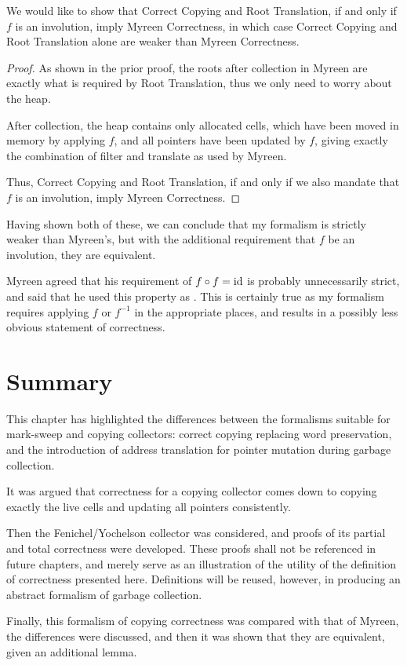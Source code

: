 \begin{theorem}
  We would like to show that Correct Copying and Root Translation, if
  and only if $f$ is an involution, imply Myreen Correctness, in which
  case Correct Copying and Root Translation alone are weaker than
  Myreen Correctness.
\end{theorem}

\begin{proof}
    As shown in the prior proof, the roots after collection in Myreen
    are exactly what is required by Root Translation, thus we only
    need to worry about the heap.

    After collection, the heap contains only allocated cells, which
    have been moved in memory by applying $f$, and all pointers have
    been updated by $f$, giving exactly the combination of filter and
    translate as used by Myreen.

    Thus, Correct Copying and Root Translation, if and only if we also
    mandate that $f$ is an involution, imply Myreen Correctness.
\end{proof}

Having shown both of these, we can conclude that my formalism is
strictly weaker than Myreen's, but with the additional requirement
that $f$ be an involution, they are equivalent.

Myreen\cite{MyreenEmail} agreed that his requirement of $f \circ f =
\mathrm{id}$ is probably unnecessarily strict, and said that he used this
property as . This is certainly true as my formalism requires
applying $f$ or $f^{-1}$ in the appropriate places, and results in a
possibly less obvious statement of correctness.

\section{Summary}
\label{sec:copying-summary}

This chapter has highlighted the differences between the formalisms
suitable for mark-sweep and copying collectors: correct copying
replacing word preservation, and the introduction of address
translation for pointer mutation during garbage collection.

It was argued that correctness for a copying collector comes down to
copying exactly the live cells and updating all pointers consistently.

Then the Fenichel/Yochelson\cite{Fenichel69} collector was considered,
and proofs of its partial and total correctness were developed. These
proofs shall not be referenced in future chapters, and merely serve as
an illustration of the utility of the definition of correctness
presented here. Definitions will be reused, however, in producing an
abstract formalism of garbage collection.

Finally, this formalism of copying correctness was compared with that
of Myreen\cite{Myreen10}, the differences were discussed, and then it
was shown that they are equivalent, given an additional lemma.
